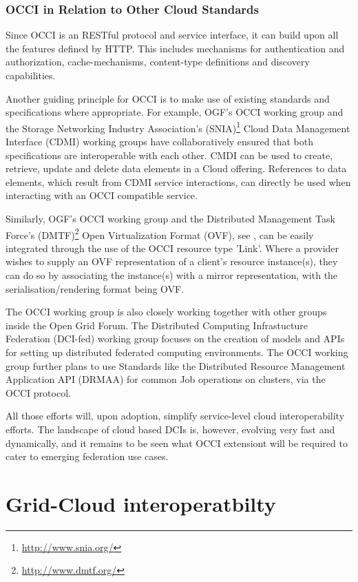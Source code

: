 \documentclass[10pt,conference,final,letterpaper,twoside,twocolumn,]{IEEEtran}
\begin{document}
 \subsubsection{OCCI in Relation to Other Cloud Standards}

 Since OCCI is an RESTful protocol and service interface, it can build
 upon all the features defined by HTTP. This includes mechanisms for
 authentication and authorization, cache-mechanisms, content-type
 definitions and discovery capabilities.
 
 Another guiding principle for OCCI is to make use of existing
 standards and specifications where appropriate.  For example, OGF's
 OCCI working group and the Storage Networking Industry Association's
 (SNIA)\footnote{\url{http://www.snia.org/}} Cloud Data Management
 Interface (CDMI) working groups have collaboratively ensured that
 both specifications are interoperable with each other.  CMDI can be
 used to create, retrieve, update and delete data elements in a Cloud
 offering. References to data elements, which result from CDMI service
 interactions, can directly be used when interacting with an OCCI
 compatible service.
 
 Similarly, OGF's OCCI working group and the Distributed Management
 Task Force's (DMTF)\footnote{\url{http://www.dmtf.org/}} Open
 Virtualization Format (OVF), see \cite{CDG+2009}, can be easily
 integrated through the use of the OCCI resource type 'Link'.  Where a
 provider wishes to supply an OVF representation of a client's
 resource instance(s), they can do so by associating the instance(s)
 with a mirror representation, with the serialisation/rendering format
 being OVF.
 
 The OCCI working group is also closely working together with other
 groups inside the Open Grid Forum. The Distributed Computing
 Infrastucture Federation (DCI-fed) working group focuses on the
 creation of models and APIs for setting up distributed federated
 computing environments. The OCCI working group further plans to use
 Standards like the Distributed Resource Management Application API
 (DRMAA) for common Job operations on clusters, via the OCCI protocol.
 
 All those efforts will, upon adoption, simplify service-level cloud
 interoperability efforts.  The landscape of cloud based DCIs is,
 however, evolving very fast and dynamically, and it remains to be
 seen what OCCI extensiont will be required to cater to emerging
 federation use cases.
 
 
\section{Grid-Cloud interoperatbilty}
\label{sec:gcinterop}
 
\end{document}
